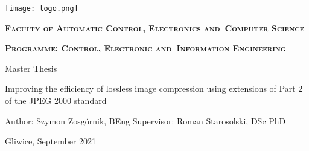 \newpage
\thispagestyle{empty}
\begin{onehalfspacing}
\begin{center}
	\texttt{[image: logo.png]}
	\vspace{1.8cm}
	
	\fontsize{18}{18} \selectfont
	\textbf{\textsc{Faculty of Automatic Control, Electronics and~Computer Science}} \linebreak

	\fontsize{18}{18} \selectfont
	\textbf{\textsc{Programme: Control, Electronic and~Information Engineering}}
	\vspace{2.3cm}
	
	\fontsize{18}{18} \selectfont
	Master Thesis

	\vspace{1.7cm}
	
	\fontsize{16}{16} \selectfont
	Improving the efficiency of lossless image compression \linebreak
	using extensions of Part 2 of the JPEG 2000 standard
	\vspace{4cm}
	
	\fontsize{14}{14} \selectfont
	\begin{flushleft}
	Author: Szymon Zosgórnik, BEng \linebreak
	\linebreak
	Supervisor: Roman Starosolski, DSc PhD \linebreak
	\end{flushleft}
	
	\vfill
	\fontsize{14}{14} \selectfont
	Gliwice, September 2021
\end{center}
\end{onehalfspacing}
